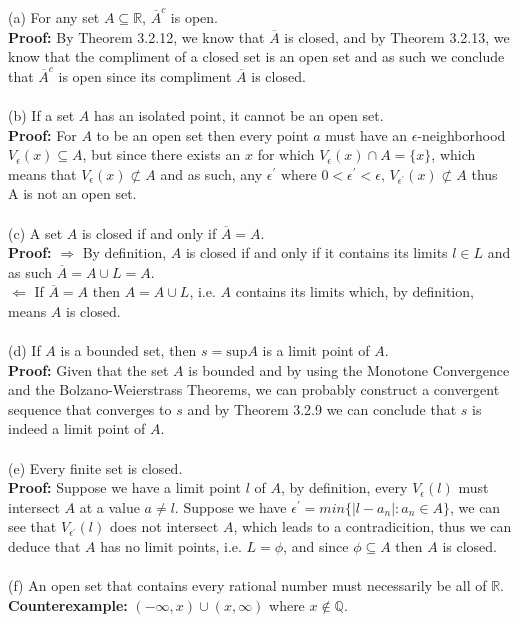 \documentclass{article}
\begin{document}
\begin{itemize}
	(a) For any set $A \subseteq \mathbb{R}$, $\overline{A}^c$ is open. \\
	\textbf{Proof:} By Theorem 3.2.12, we know that $\overline{A}$ is closed, and by Theorem 3.2.13, we know that the compliment of a closed set is an open set and as such we conclude that $\overline{A}^c$ is open since its compliment $\overline{A}$ is closed. \\ \\ 
	(b) If a set $A$ has an isolated point, it cannot be an open set. \\
	\textbf{Proof:} For $A$ to be an open set then every point $a$ must have an $\epsilon$-neighborhood $V_\epsilon(x) \subseteq A$, but since there exists an $x$ for which $V_\epsilon(x) \cap A = \{x\}$, which means that $V_\epsilon(x) \not\subset A$ and as such, any $\epsilon^{'} \text{ where } 0 < \epsilon^{'} < \epsilon \text{, } V_{\epsilon^{'}}(x) \not\subset A$ thus A is not an open set. \\ \\  
	(c) A set $A$ is closed if and only if $\overline{A} = A$. \\
	\textbf{Proof:} $\Rightarrow$ By definition, $A$ is closed if and only if it contains its limits $l \in L$ and as such $\overline{A} = A \cup L = A$. \\
	$\Leftarrow$ If $\overline{A} = A$ then $A = A \cup L$, i.e. $A$ contains its limits which, by definition, means $A$ is closed. \\ \\
	(d) If $A$ is a bounded set, then $s = \text{sup}A$ is a limit point of $A$. \\
	\textbf{Proof:} Given that the set $A$ is bounded and by using the Monotone Convergence and the Bolzano-Weierstrass Theorems, we can probably construct a convergent sequence that converges to $s$ and by Theorem 3.2.9 we can conclude that $s$ is indeed a limit point of $A$.\\ \\ 
	(e) Every finite set is closed. \\
	\textbf{Proof:} Suppose we have a limit point $l$ of $A$, by definition, every $V_\epsilon(l)$ must intersect $A$ at a value $a \neq l$. Suppose we have $\epsilon^{'} = min\{|l - a_n|: a_n \in A\}$, we can see that $V_{\epsilon^{'}}(l)$ does not intersect $A$, which leads to a contradicition, thus we can deduce that $A$ has no limit points, i.e. $L = \phi$, and since $\phi \subseteq A$ then $A$ is closed. \\ \\
	(f) An open set that contains every rational number must necessarily be all of $\mathbb{R}$. \\
	\textbf{Counterexample:} $(-\infty, x) \cup (x, \infty)$ where $x \not\in \mathbb{Q}$. \\ 
\end{itemize}
\end{document}
